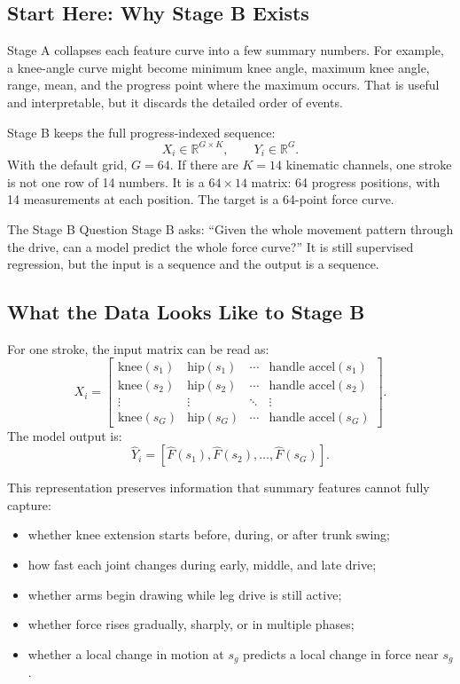\documentclass[11pt]{article}
\newcommand{\R}{\mathbb{R}}
\begin{document}
\subsection{Start Here: Why Stage B Exists}

Stage A collapses each feature curve into a few summary numbers. For example,
a knee-angle curve might become minimum knee angle, maximum knee angle, range,
mean, and the progress point where the maximum occurs. That is useful and
interpretable, but it discards the detailed order of events.

Stage B keeps the full progress-indexed sequence:
\[
  X_i \in \R^{G \times K},
  \qquad
  Y_i \in \R^{G}.
\]
With the default grid, \(G=64\). If there are \(K=14\) kinematic channels, one
stroke is not one row of 14 numbers. It is a \(64 \times 14\) matrix: 64
progress positions, with 14 measurements at each position. The target is a
64-point force curve.

\begin{conceptbox}{The Stage B Question}
Stage B asks: ``Given the whole movement pattern through the drive, can a model
predict the whole force curve?'' It is still supervised regression, but the
input is a sequence and the output is a sequence.
\end{conceptbox}

\subsection{What the Data Looks Like to Stage B}

For one stroke, the input matrix can be read as:
\[
  X_i =
  \begin{bmatrix}
  \text{knee}(s_1) & \text{hip}(s_1) & \cdots & \text{handle accel}(s_1)\\
  \text{knee}(s_2) & \text{hip}(s_2) & \cdots & \text{handle accel}(s_2)\\
  \vdots & \vdots & \ddots & \vdots\\
  \text{knee}(s_G) & \text{hip}(s_G) & \cdots & \text{handle accel}(s_G)
  \end{bmatrix}.
\]
The model output is:
\[
  \hat{Y}_i =
  [\hat{F}(s_1),\hat{F}(s_2),\ldots,\hat{F}(s_G)].
\]

This representation preserves information that summary features cannot fully
capture:
\begin{itemize}[leftmargin=*]
  \item whether knee extension starts before, during, or after trunk swing;
  \item how fast each joint changes during early, middle, and late drive;
  \item whether arms begin drawing while leg drive is still active;
  \item whether force rises gradually, sharply, or in multiple phases;
  \item whether a local change in motion at \(s_g\) predicts a local change in
  force near \(s_g\).
\end{itemize}
\end{document}
